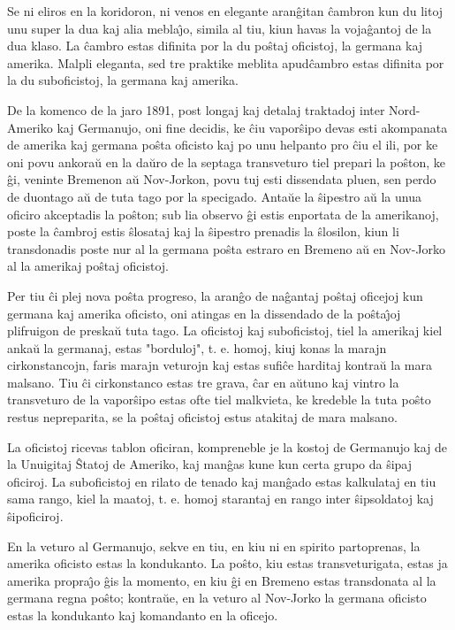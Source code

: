    Se ni eliros en la koridoron, ni venos en elegante aran\^gitan
\^cambron kun du litoj unu super la dua kaj alia mebla\^{\j}o,
simila al tiu, kiun havas la voja\^gantoj de la dua klaso. La
\^cambro estas difinita por la du po\^staj oficistoj, la germana kaj
amerika. Malpli eleganta, sed tre praktike meblita apud\^cambro
estas difinita por la du suboficistoj, la germana kaj amerika.

   De la komenco de la jaro 1891, post longaj kaj detalaj traktadoj
inter Nord-Ameriko kaj Germanujo, oni fine decidis, ke \^ciu
vapor\^sipo devas esti akompanata de amerika kaj germana po\^sta
oficisto kaj po unu helpanto pro \^ciu el ili, por ke oni povu
ankora\u u en la da\u uro de la septaga transveturo tiel prepari la
po\^ston, ke \^gi, veninte Bremenon a\u u Nov-Jorkon, povu tuj esti
dissendata pluen, sen perdo de duontago a\u u de tuta tago por la
specigado. Anta\u ue la \^sipestro a\u u la unua oficiro akceptadis
la po\^ston; sub lia observo \^gi estis enportata de la amerikanoj,
poste la \^cambroj estis \^slosataj kaj la \^sipestro prenadis la
\^slosilon, kiun li transdonadis poste nur al la germana po\^sta
estraro en Bremeno a\u u en Nov-Jorko al la amerikaj po\^staj
oficistoj.

   Per tiu \^ci plej nova po\^sta progreso, la aran\^go de na\^gantaj
po\^staj oficejoj kun germana kaj amerika oficisto, oni atingas en
la dissendado de la po\^sta\^{\j}oj plifruigon de preska\u u tuta
tago. La oficistoj kaj suboficistoj, tiel la amerikaj kiel anka\u u
la germanaj, estas "borduloj", t. e. homoj, kiuj konas la marajn
cirkonstancojn, faris marajn veturojn kaj estas sufi\^ce harditaj
kontra\u u la mara malsano. Tiu \^ci cirkonstanco estas tre grava,
\^car en a\u utuno kaj vintro la transveturo de la vapor\^sipo estas
ofte tiel malkvieta, ke kredeble la tuta po\^sto restus nepreparita,
se la po\^staj oficistoj estus atakitaj de mara malsano.

   La oficistoj ricevas tablon oficiran, kompreneble je la kostoj de
Germanujo kaj de la Unuigitaj \^Statoj de Ameriko, kaj man\^gas kune
kun certa grupo da \^sipaj oficiroj. La suboficistoj en rilato de
tenado kaj man\^gado estas kalkulataj en tiu sama rango, kiel la
maatoj, t. e. homoj starantaj en rango inter \^sipsoldatoj kaj
\^sipoficiroj.

   En la veturo al Germanujo, sekve en tiu, en kiu ni en spirito
partoprenas, la amerika oficisto estas la kondukanto. La po\^sto,
kiu estas transveturigata, estas ja amerika propra\^{\j}o \^gis la
momento, en kiu \^gi en Bremeno estas transdonata al la germana
regna po\^sto; kontra\u ue, en la veturo al Nov-Jorko la germana
oficisto estas la kondukanto kaj komandanto en la oficejo.

